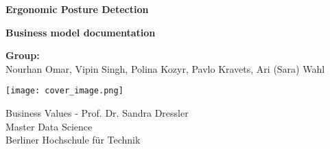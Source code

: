 \begin{titlepage}
    \begin{center}
        \vspace*{1cm}
        
        \Huge
        \textbf{Ergonomic Posture Detection}
        
        \vspace{0.5cm}
        \LARGE
        \textbf{Business model documentation}
        
        \vspace{1.5cm}
        \Large
        \textbf{Group:}\\
        Nourhan Omar, Vipin Singh, Polina Kozyr, Pavlo Kravets, Ari (Sara) Wahl
        
        \vfill
        \texttt{[image: cover\_image.png]}
        \vfill
        
        \Large
        Business Values - Prof. Dr. Sandra Dressler\\
        Master Data Science\\
        Berliner Hochschule für Technik
        
    \end{center}
\end{titlepage}